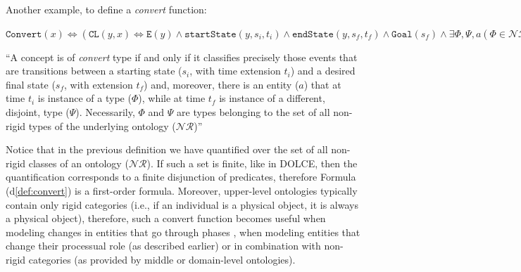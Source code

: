 \documentclass[sw]{iosart2x}
\newcommand{\bflist}{\begin{list}{}{\setlength{\topsep}{2mm}\setlength{\partopsep}{0mm}\setlength{\parsep}{0mm}\setlength{\leftmargin}{9mm}\setlength{\labelwidth}{8mm}}}
\newcommand{\eflist}{\end{list}}
\newcommand{\DefLabel}{\textrm{d}}
\newcounter{cntdef}
\newcommand{\mydf}[1]{\refstepcounter{cntdef}\begin{small}{\bf \DefLabel\thecntdef\label{def:#1}}\end{small}}
\newcommand{\mytext}[1]{``#1''}
\newcommand{\refdf}[1]{({\DefLabel}\ref{#1})}
\newcommand{\generalStyle}[1]{\texttt{#1}}
\newcommand{\biRel}[3]{\generalStyle{#1}(#2,#3)}
\newcommand{\uniRel}[2]{\generalStyle{#1}(#2)}
\newcommand{\triRel}[4]{\generalStyle{#1}(#2,#3,#4)}
\newcommand{\myiff}{\Longleftrightarrow}
\newcommand{\DOLCE}{\textsc{DOLCE}\xspace} %
\newcommand{\DOLCEEvent}[1]{\uniRel{{E}}{#1}}
\newcommand{\DOLCEPC}[3]{\triRel{{PC}}{#1}{#2}{#3}}
\newcommand{\DOLCECLbyBinary}[2]{\biRel{CL}{#1}{#2}}
\newcommand{\Goal}[1]{\uniRel{Goal}{#1}}
\newcommand{\Convert}[1]{\uniRel{Convert}{#1}}
\newcommand{\sState}[3]{\triRel{startState}{#1}{#2}{#3}}
\newcommand{\eState}[3]{\triRel{endState}{#1}{#2}{#3}}
\begin{document}

Another example, to define a \textit{convert} function: 
\bflist
  \item[\mydf{convert}] $ \Convert{x} \myiff (\DOLCECLbyBinary{y}{x} \myiff \DOLCEEvent{y} \land \sState{y}{s_i}{t_i} \land \eState{y}{s_f}{t_f} \land \Goal{s_f} \land \exists \Phi,\Psi,a (\Phi\in\mathcal{NR} \land \Psi\in\mathcal{NR} \land \Psi\cap\Phi = \emptyset \land  \DOLCEPC{a}{s_i}{t_i} \land \DOLCEPC{a}{s_f}{t_f} \land \Phi(a,t_i) \land \Psi(a,t_f))) $ 
  \item[] \mytext{A concept is of \textit{convert} type if and only if it classifies precisely those events that are transitions between a starting state ($s_i$, with time extension $t_i$) and a desired final state ($s_f$, with extension $t_f$) and, moreover, there is an entity ($a$) that at time $t_i$ is instance of a type ($\Phi$), while at time $t_f$ is instance of a different, disjoint, type ($\Psi$). Necessarily, $\Phi$ and $\Psi$ are types belonging to the set of all non-rigid types of the underlying ontology ($\mathcal{NR}$)}
\eflist 
Notice that in the previous definition we have quantified over the set of all non-rigid classes of an ontology ($\mathcal{NR}$). 
If such a set is finite, like in \DOLCE, then the quantification corresponds to a finite disjunction of predicates, therefore Formula \refdf{def:convert} is a first-order formula.
Moreover, upper-level ontologies typically contain only rigid categories (i.e., if an individual is a physical object, it is always a physical object), therefore, such a convert function becomes useful when modeling changes in entities that go through phases \cite{guarinoOverviewOntoClean2009}, when modeling entities that change their processual role (as described earlier) or in combination with non-rigid categories (as provided by middle or domain-level ontologies).
\end{document}
